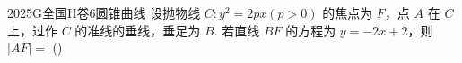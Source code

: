 
\begin{problem}{2025}{G}{全国II卷}{6}{圆锥曲线}
设抛物线 $C: y^2=2px (p>0)$ 的焦点为 $F$，点 $A$ 在 $C$ 上，过作 $C$ 的准线的垂线，垂足为 $B$. 若直线 $BF$ 的方程为 $y=-2x+2$，则 $|AF|=$
(\hspace{1cm})
\begin{choices}
\end{choices}
\end{problem}